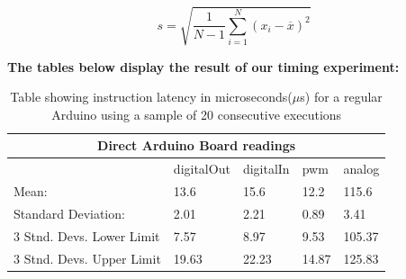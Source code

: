 $$
s = \sqrt{\frac{1}{N-1} \sum_{i=1}^N (x_i - \overline{x})^2}
$$
\label{eq:sd}

\newpage
\textbf{The tables below display the result of our timing experiment: }

\begin{table}[h!]
	\caption{Table showing instruction latency in microseconds($\mu$s) for a regular Arduino using a sample of 20 consecutive executions}\label{table:arduinoboard}
	\begin{tabular}{|l|l|l|l|l|}
	\toprule
 \multicolumn{5}{c}{\textbf{Direct Arduino Board readings}} \\\hline

& digitalOut & digitalIn & pwm & analog \\\hline
Mean:                   & 13.6 & 15.6 & 12.2 & 115.6\\\hline
Standard Deviation:     & 2.01 & 2.21  & 0.89  & 3.41 \\\hline
3 Stnd. Devs. Lower Limit& 7.57 & 8.97  & 9.53  & 105.37 \\\hline
3 Stnd. Devs. Upper Limit& 19.63& 22.23 & 14.87 & 125.83 \\\hline
\end{tabular}
\end{table}

